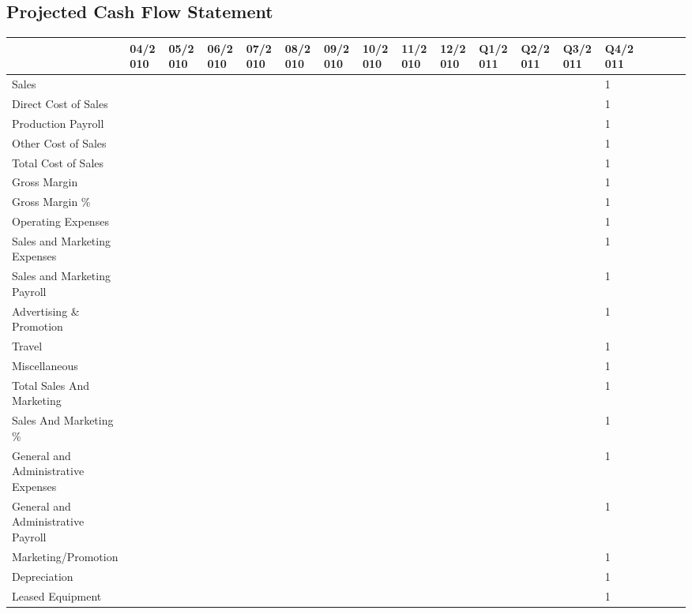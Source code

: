 \documentclass[11pt,titlepage]{article}
\begin{document}
\begin{landscape}
\subsection{Projected Cash Flow Statement}
\begin{scriptsize}
\begin{tabular}{ | l | l | l | l | l | l | l | l | l | l | l | l | l | l | l | l | l | l |}\hline
  & 04/2010 & 05/2010 & 06/2010 & 07/2010 & 08/2010 & 09/2010 & 10/2010 & 11/2010 & 12/2010 & Q1/2011 & Q2/2011 & Q3/2011 & Q4/2011 \\ \hline
  Sales & & & & & & & & & & & & & 1\\ \hline
  Direct Cost of Sales & & & & & & & & & & & & & 1 \\ \hline
  Production Payroll & & & & & & & & & & & & & 1 \\ \hline
  Other Cost of Sales & & & & & & & & & & & & & 1 \\ \hline
  Total Cost of Sales & & & & & & & & & & & & & 1 \\ \hline
  Gross Margin & & & & & & & & & & & & & 1 \\ \hline
  Gross Margin \% & & & & & & & & & & & & & 1 \\ \hline
  Operating Expenses & & & & & & & & & & & & & 1 \\ \hline
  Sales and Marketing Expenses & & & & & & & & & & & & & 1 \\ \hline
  Sales and Marketing Payroll & & & & & & & & & & & & & 1 \\ \hline
  Advertising \& Promotion & & & & & & & & & & & & & 1 \\ \hline
  Travel & & & & & & & & & & & & & 1 \\ \hline
  Miscellaneous & & & & & & & & & & & & & 1 \\ \hline
  Total Sales And Marketing & & & & & & & & & & & & & 1 \\ \hline
  Sales And Marketing \% & & & & & & & & & & & & & 1 \\ \hline
  General and Administrative Expenses & & & & & & & & & & & & & 1 \\ \hline
  General and Administrative Payroll & & & & & & & & & & & & & 1 \\ \hline
  Marketing/Promotion & & & & & & & & & & & & & 1 \\ \hline
  Depreciation & & & & & & & & & & & & & 1 \\ \hline
  Leased Equipment & & & & & & & & & & & & & 1 \\ \hline

\end{tabular}
\end{scriptsize}
\end{landscape}
\end{document}
